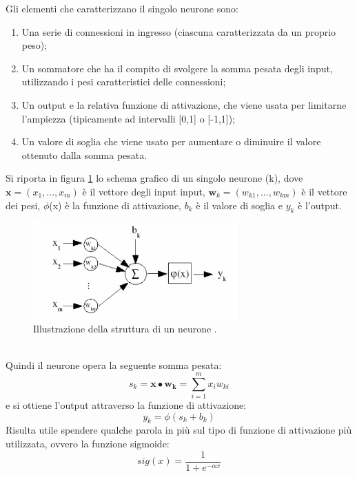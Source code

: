 Gli elementi che caratterizzano il singolo neurone sono:
\begin{enumerate}
	\item Una serie di connessioni in ingresso (ciascuna caratterizzata da un proprio peso);
	\item Un sommatore che ha il compito di svolgere la somma pesata degli input, utilizzando i pesi caratteristici delle connessioni;
	\item Un output e la relativa funzione di attivazione, che viene usata per limitarne l'ampiezza (tipicamente ad intervalli [0,1] o [-1,1]);
	\item Un valore di soglia che viene usato per aumentare o diminuire il valore ottenuto dalla somma pesata.
\end{enumerate}
Si riporta in figura \ref{schema_neurone} lo schema grafico di un singolo neurone (k), dove $\textbf{x} = (x_1 ,..., x_m)$ è il vettore degli input input, $\textbf{w}_k = (w_{k1} ,..., w_{km})$ è il vettore dei pesi, $\phi$(x) è la funzione di attivazione, $b_k$ è il valore di soglia e $y_k$ è l'output.
\begin{figure}[h!]
	\centering
	\includegraphics[width=0.70\textwidth]{figs/schema_neurone.png}
	\caption{Illustrazione della struttura di un neurone \cite{Intro_retiN}.}
	\label{schema_neurone}	
\end{figure} \\
Quindi il neurone opera la seguente somma pesata:
\begin{equation}
s_k = \textbf{x}\bullet\textbf{w}_\textbf{k} = \sum_{i=1}^{m}x_iw_{ki}
\label{sk}
\end{equation}
e si ottiene l'output attraverso la funzione di attivazione: 
\begin{equation}
y_k = \phi(s_k + b_k)
\end{equation}
Risulta utile spendere qualche parola in più sul tipo di funzione di attivazione più utilizzata, ovvero la funzione sigmoide:
\begin{equation}
sig(x) = \frac{1}{1 + e^{-{\alpha}x}}
\end{equation} 
